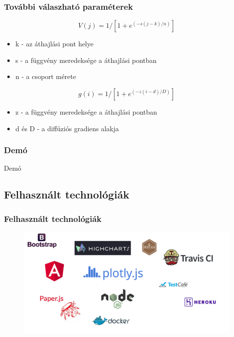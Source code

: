 \begin{frame}
	\frametitle{További válaszható paraméterek}
	\begin{block}{}
		\begin{equation}
		V(j) = 1/[1 + e^{(-s(j-k)/n)}]
		\end{equation}
		\begin{itemize}
			\item k - az áthajlási pont helye
			\item s - a függvény meredeksége a áthajlási pontban
			\item n - a csoport mérete
		\end{itemize}
	\end{block}
	\begin{block}{}
		\begin{equation}
		g(i) = 1/[1 + e^{(-z(i-d)/D)}]
		\end{equation}
		\begin{itemize}
			\item z - a függvény meredeksége a áthajlási pontban
			\item d és D - a diffúziós gradiens alakja
		\end{itemize}
	\end{block}
\end{frame}

\begin{frame}
	\frametitle{Demó}
	\Huge{\centerline{Demó}}
\end{frame}

\subsection{Felhasznált technológiák}
\begin{frame}
	\frametitle{Felhasznált technológiák}
	\begin{figure}[ht!]
		\centering
		\includegraphics[width=\linewidth]{images/technologies}
	\end{figure}
\end{frame}
